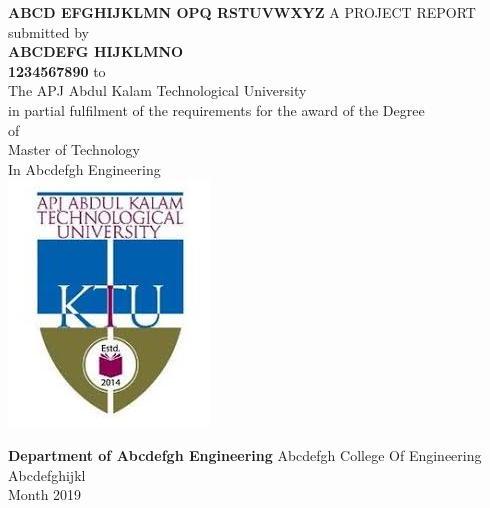 \documentclass[12pt,a4paper]{report}
\def \reptitle{Abcd Efghijklmn Opq Rstuvwxyz}
\def \repauthor{ABCDEFG HIJKLMNO}
\def \repregno{1234567890}
\def \repdegree{Master of Technology}
\def \repbranch{Abcdefgh Engineering}
\def \repcollege{Abcdefgh College Of Engineering}
\def \repplace{Abcdefghijkl}
\def \repuniversity{APJ Abdul Kalam Technological University}
\def \repdate{Month 2019}
\begin{document}
\makeatletter
\renewcommand\chapter{\if@openright\cleardoublepage\else\clearpage\fi
                    \thispagestyle{empty}%
                    \global\@topnum\z@
                    \@afterindentfalse
                    \secdef\@chapter\@schapter}
\makeatother

\begin{titlepage}

\begin{center}
    \textbf{\MakeUppercase{ \Large \reptitle}}
    \vspace{.5 cm}
    \break
    A PROJECT REPORT \\
    submitted by\\
    \vspace{0.3 cm}
    \textbf{ \large \repauthor \\
    \repregno }
    \vspace{0.3 cm}
    to \\ The \repuniversity \\
    in partial fulfilment of the requirements for the award of the Degree \\
    of \\
    \repdegree \\
    In
    \repbranch \\
    \vspace{0.4 cm}
    \includegraphics[height=0.4\textwidth]{ktu_logo}\par
    \vspace{0.5 cm}
    \textbf{\Large Department of \repbranch}
    \repcollege
    \break
    \repplace \\
    \repdate
    \vfill
\end{center}

\end{titlepage}
\end{document}
